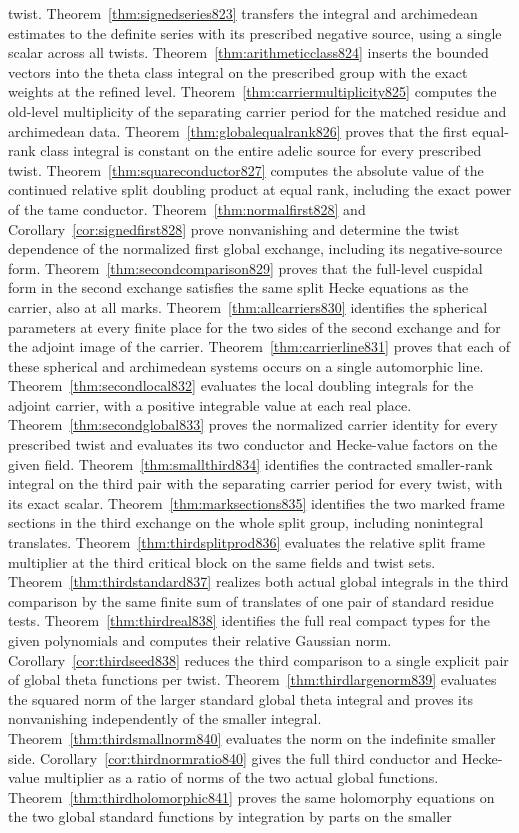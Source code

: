 \documentclass[a4paper,11pt]{article}
\theoremstyle{definition}
\theoremstyle{remark}
\numberwithin{equation}{section}
\begin{document}
twist. Theorem~\ref{thm:signedseries823} transfers the integral and archimedean estimates to the definite series with its prescribed negative source, using a single scalar across all twists. Theorem~\ref{thm:arithmeticclass824} inserts the bounded vectors into the theta class integral on the prescribed group with the exact weights at the refined level. Theorem~\ref{thm:carriermultiplicity825} computes the old-level multiplicity of the separating carrier period for the matched residue and archimedean data. Theorem~\ref{thm:globalequalrank826} proves that the first equal-rank class integral is constant on the entire adelic source for every prescribed twist. Theorem~\ref{thm:squareconductor827} computes the absolute value of the continued relative split doubling product at equal rank, including the exact power of the tame conductor. Theorem~\ref{thm:normalfirst828} and Corollary~\ref{cor:signedfirst828} prove nonvanishing and determine the twist dependence of the normalized first global exchange, including its negative-source form. Theorem~\ref{thm:secondcomparison829} proves that the full-level cuspidal form in the second exchange satisfies the same split Hecke equations as the carrier, also at all marks. Theorem~\ref{thm:allcarriers830} identifies the spherical parameters at every finite place for the two sides of the second exchange and for the adjoint image of the carrier. Theorem~\ref{thm:carrierline831} proves that each of these spherical and archimedean systems occurs on a single automorphic line. Theorem~\ref{thm:secondlocal832} evaluates the local doubling integrals for the adjoint carrier, with a positive integrable value at each real place. Theorem~\ref{thm:secondglobal833} proves the normalized carrier identity for every prescribed twist and evaluates its two conductor and Hecke-value factors on the given field. Theorem~\ref{thm:smallthird834} identifies the contracted smaller-rank integral on the third pair with the separating carrier period for every twist, with its exact scalar. Theorem~\ref{thm:marksections835} identifies the two marked frame sections in the third exchange on the whole split group, including nonintegral translates. Theorem~\ref{thm:thirdsplitprod836} evaluates the relative split frame multiplier at the third critical block on the same fields and twist sets. Theorem~\ref{thm:thirdstandard837} realizes both actual global integrals in the third comparison by the same finite sum of translates of one pair of standard residue tests. Theorem~\ref{thm:thirdreal838} identifies the full real compact types for the given polynomials and computes their relative Gaussian norm. Corollary~\ref{cor:thirdseed838} reduces the third comparison to a single explicit pair of global theta functions per twist. Theorem~\ref{thm:thirdlargenorm839} evaluates the squared norm of the larger standard global theta integral and proves its nonvanishing independently of the smaller integral. Theorem~\ref{thm:thirdsmallnorm840} evaluates the norm on the indefinite smaller side. Corollary~\ref{cor:thirdnormratio840} gives the full third conductor and Hecke-value multiplier as a ratio of norms of the two actual global functions. Theorem~\ref{thm:thirdholomorphic841} proves the same holomorphy equations on the two global standard functions by integration by parts on the smaller 
\end{document}
